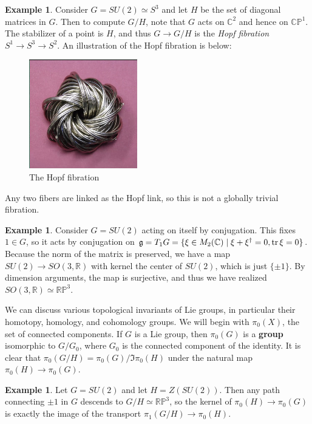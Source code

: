 \documentclass[leqno, openany]{memoir}
\theoremstyle{definition}
\newtheorem{exm}[thm]{Example}
\theoremstyle{remark}
\theoremstyle{plain}
\theoremstyle{definition}
\theoremstyle{remark}
\newcommand{\R}{\mathbb{R}}
\newcommand{\C}{\mathbb{C}}
\renewcommand{\P}{\mathbb{P}}
\newcommand{\mf}[1]{\mathfrak{#1}}
\begin{document}
\begin{exm}
    Consider $G = SU(2) \simeq S^3$ and let $H$ be the set of diagonal matrices in $G$. Then to compute $G/H$, note that $G$ acts on $\C^2$ and hence on $\C\P^1$. The stabilizer of a point is $H$, and thus $G \to G/H$ is the \textit{Hopf fibration} $S^1 \to S^3 \to S^2$. An illustration of the Hopf fibration is below:
    \begin{figure}[H]
        \centering
        \includegraphics[scale=1]{hopf}
        \caption{The Hopf fibration}%
        \label{fig:hopf}
    \end{figure}
    Any two fibers are linked as the Hopf link, so this is not a globally trivial fibration.
\end{exm}

\begin{exm}
    Consider $G = SU(2)$ acting on itself by conjugation. This fixes $1 \in G$, so it acts by conjugation on $\mf{g} = T_1 G = \{ \xi \in M_2(\C) \mid \xi + \xi^{\dag} = 0, \trace \xi = 0 \}$. Because the norm of the matrix is preserved, we have a map $SU(2) \to SO(3, \R)$ with kernel the center of $SU(2)$, which is just $\{ \pm 1 \}$. By dimension arguments, the map is surjective, and thus we have realized $SO(3, \R) \simeq \R \P^3$.
\end{exm}

We can discuss various topological invariants of Lie groups, in particular their homotopy, homology, and cohomology groups. We will begin with $\pi_0(X)$, the set of connected components. If $G$ is a Lie group, then $\pi_0(G)$ is a \textbf{group} isomorphic to $G / G_0$, where $G_0$ is the connected component of the identity. It is clear that $\pi_0(G/H) = \pi_0(G) / \Im \pi_0(H)$ under the natural map $\pi_0(H) \to \pi_0(G)$.

\begin{exm}
    Let $G = SU(2)$ and let $H = Z(SU(2))$. Then any path connecting $\pm 1$ in $G$ descends to $G/H \simeq \R\P^3$, so the kernel of $\pi_0(H) \to \pi_0(G)$ is exactly the image of the transport $\pi_1(G/H) \to \pi_0(H)$.
\end{exm}
\end{document}
